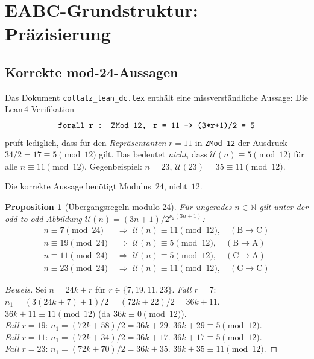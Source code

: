 \documentclass[12pt,a4paper]{article}
\newtheorem{proposition}[definition]{Proposition}
\newenvironment{beweis}{\begin{proof}[Beweis]}{\end{proof}}
\newcommand{\vii}{\nu_2}
\newcommand{\U}{\mathcal{U}}
\newcommand{\N}{\mathbb{N}}
\begin{document}
\section{EABC-Grundstruktur: Präzisierung}
\label{sec:eabc}

\subsection{Korrekte mod-24-Aussagen}

\begin{tcolorbox}[korrektur]
Das Dokument \texttt{collatz\_lean\_dc.tex} enthält eine missverständliche
Aussage: Die Lean\,4-Verifikation
\[
  \texttt{forall r : ZMod 12,\; r = 11 -> (3*r+1)/2 = 5}
\]
prüft lediglich, dass für den \emph{Repräsentanten} $r = 11$ in \texttt{ZMod\,12}
der Ausdruck $34/2 = 17 \equiv 5 \pmod{12}$ gilt.
Das bedeutet \emph{nicht}, dass $\U(n) \equiv 5 \pmod{12}$ für alle
$n \equiv 11 \pmod{12}$. Gegenbeispiel: $n = 23$, $\U(23) = 35 \equiv 11 \pmod{12}$.

Die korrekte Aussage benötigt Modulus~$24$, nicht~$12$.
\end{tcolorbox}

\begin{proposition}[Übergangsregeln modulo 24]
\label{prop:mod24}
Für ungerades $n \in \N$ gilt unter der odd-to-odd-Abbildung $\U(n) = (3n+1)/2^{\vii(3n+1)}$:
\begin{align*}
  n \equiv 7  \pmod{24} \;&\Rightarrow\; \U(n) \equiv 11 \pmod{12},\quad (\text{B} \to \text{C})\\
  n \equiv 19 \pmod{24} \;&\Rightarrow\; \U(n) \equiv 5  \pmod{12},\quad (\text{B} \to \text{A})\\
  n \equiv 11 \pmod{24} \;&\Rightarrow\; \U(n) \equiv 5  \pmod{12},\quad (\text{C} \to \text{A})\\
  n \equiv 23 \pmod{24} \;&\Rightarrow\; \U(n) \equiv 11 \pmod{12},\quad (\text{C} \to \text{C})
\end{align*}
\end{proposition}

\begin{beweis}
Sei $n = 24k + r$ für $r \in \{7,19,11,23\}$.
\textit{Fall $r=7$}: $n_1 = (3(24k+7)+1)/2 = (72k+22)/2 = 36k+11$.
$36k+11 \equiv 11 \pmod{12}$ (da $36k \equiv 0 \pmod{12}$). \\
\textit{Fall $r=19$}: $n_1 = (72k+58)/2 = 36k+29$. $36k+29 \equiv 5 \pmod{12}$. \\
\textit{Fall $r=11$}: $n_1 = (72k+34)/2 = 36k+17$. $36k+17 \equiv 5 \pmod{12}$. \\
\textit{Fall $r=23$}: $n_1 = (72k+70)/2 = 36k+35$. $36k+35 \equiv 11 \pmod{12}$.
\end{beweis}
\end{document}
